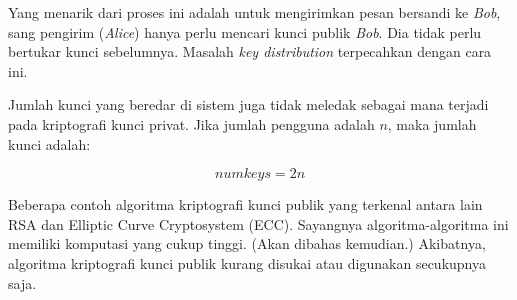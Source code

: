 Yang menarik dari proses ini adalah untuk mengirimkan pesan bersandi ke {\em
Bob}, sang pengirim ({\em Alice}) hanya perlu mencari kunci publik {\em Bob}.
Dia tidak perlu bertukar kunci sebelumnya. Masalah {\em key distribution}
terpecahkan dengan cara ini.

Jumlah kunci yang beredar di sistem juga tidak meledak sebagai mana terjadi
pada kriptografi kunci privat. Jika jumlah pengguna adalah $n$, maka jumlah
kunci adalah:

\begin{equation}
   numkeys = 2n
\end{equation}

Beberapa contoh algoritma kriptografi kunci publik yang terkenal antara lain
RSA dan Elliptic Curve Cryptosystem (ECC). Sayangnya algoritma-algoritma ini
memiliki komputasi yang cukup tinggi. (Akan dibahas kemudian.) Akibatnya,
algoritma kriptografi kunci publik kurang disukai atau digunakan secukupnya
saja.
